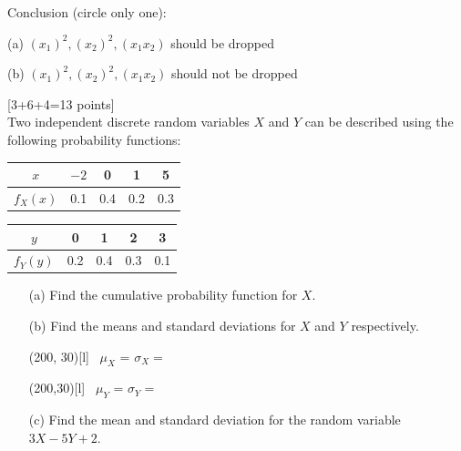 \documentclass[11pt]{article}
\begin{document}
{\begin{enumerate}
Conclusion (circle only one):

\hskip 2cm(a) $(x_1)^2, (x_2)^2, (x_1 x_2)$ should be dropped

\hskip 2cm(b) $(x_1)^2, (x_2)^2, (x_1 x_2)$ should not be dropped

\end{enumerate}

\newpage
{}\hfill[3+6+4=13 points] \\
%
 Two independent discrete random variables $X$ and  $Y$
 can be described using the following probability functions:

\begin{table}[ht]
\begin{minipage}[b]{0.5\linewidth}\centering
\begin{tabular}{c|cccc}
$x$ &$-2$& 0&1&5\\
\hline
$f_X(x)$ & 0.1&0.4 & 0.2&0.3\\
\end{tabular}
\end{minipage}
\hspace{0.5cm}
\begin{minipage}[b]{0.5\linewidth}
\centering
\begin{tabular}{c|cccc}
$y$ &0& 1&2&3\\
\hline
$f_Y(y)$ & 0.2&0.4 & 0.3&0.1\\
\end{tabular}
\end{minipage}
\end{table}
%

\begin{enumerate}

\item[(a)] Find the cumulative probability function for $X$.

\vskip 5cm

\item[(b)] Find the means and standard deviations for $X$ and $Y$
respectively.


 \hfill
\framebox(200, 30)[l]{ \,
$\mu_X$ = \hspace{2cm} $\sigma_X=$\hspace{2cm}}

 \hfill
\framebox(200,30)[l]{ \,
$\mu_Y$ = \hspace{2cm} $\sigma_Y=$\hspace{2cm}}


\vskip 8cm

\newpage
\item[(c)] Find  the mean and standard deviation
for the random variable $3X - 5Y + 2$.




\end{enumerate}}
\end{document}
